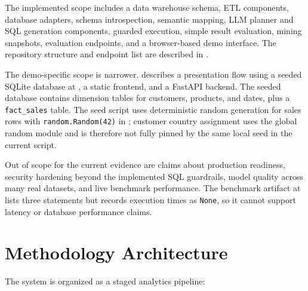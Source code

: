 \documentclass[12pt,a4paper]{article}
\begin{document}
The implemented scope includes a data warehouse schema, ETL components, database adapters, schema introspection, semantic mapping, LLM planner and SQL generation components, guarded execution, simple result evaluation, mining snapshots, evaluation endpoints, and a browser-based demo interface. The repository structure and endpoint list are described in .

The demo-specific scope is narrower.  describes a presentation flow using a seeded SQLite database at , a static frontend, and a FastAPI backend. The seeded database contains dimension tables for customers, products, and dates, plus a \texttt{fact\_sales} table. The seed script uses deterministic random generation for sales rows with \texttt{random.Random(42)} in ; customer country assignment uses the global random module and is therefore not fully pinned by the same local seed in the current script.

Out of scope for the current evidence are claims about production readiness, security hardening beyond the implemented SQL guardrails, model quality across many real datasets, and live benchmark performance. The benchmark artifact at  lists three statements but records execution times as \texttt{None}, so it cannot support latency or database performance claims.

\section{Methodology Architecture}

The system is organized as a staged analytics pipeline:
\end{document}
